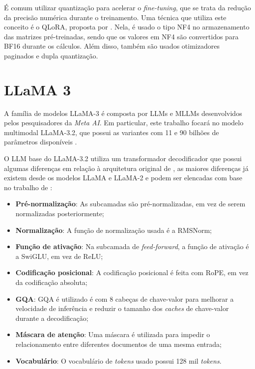 
É comum utilizar quantização para acelerar o \textit{fine-tuning}, que se trata da redução da precisão numérica durante o treinamento. Uma técnica que utiliza este
conceito é o \ac{QLoRA}, proposta por \textcite{qlora}. Nela, é usado o tipo \ac{NF4} no armazenamento das matrizes pré-treinadas, sendo que os valores em \ac{NF4} são
convertidos para \ac{BF16} durante os cálculos. Além disso, também são usados otimizadores paginados e dupla quantização.

\section{LLaMA 3}

A família de modelos \ac{LLaMA}-3 é composta por \acp{LLM} e \acp{MLLM} desenvolvidos pelos pesquisadores da
\textit{Meta AI}. Em particular, este trabalho focará no modelo multimodal \ac{LLaMA}-3.2, que possui as variantes com
11 e 90 bilhões de parâmetros disponíveis \cite{dubey2024llama}.

O \ac{LLM} base do \ac{LLaMA}-3.2 utiliza um transformador decodificador que possui algumas diferenças em relação à
arquitetura original de \textcite{transformer}, as maiores diferenças já existem desde os modelos \ac{LLaMA} e
\ac{LLaMA}-2 e podem ser elencadas com base no trabalho de \textcite{touvron2023llama}:

\begin{itemize}
    \item \textbf{Pré-normalização}: As subcamadas são pré-normalizadas, em vez de serem normalizadas posteriormente;
    \item \textbf{Normalização}: A função de normalização usada é a \ac{RMSNorm};
    \item \textbf{Função de ativação}: Na subcamada de \textit{feed-forward}, a função de ativação é a \ac{SwiGLU}, em vez de
          \ac{ReLU};
    \item \textbf{Codificação posicional}: A codificação posicional é feita com \ac{RoPE}, em vez da codificação absoluta;
    \item \textbf{\acs{GQA}}: \ac{GQA} é utilizado é com 8 cabeças de chave-valor para melhorar a velocidade de inferência e
          reduzir o tamanho dos \textit{caches} de chave-valor durante a decodificação;
    \item \textbf{Máscara de atenção}: Uma máscara é utilizada para impedir o relacionamento entre diferentes documentos de uma
          mesma entrada;
    \item \textbf{Vocabulário}: O vocabulário de \textit{tokens} usado possui 128 mil \textit{tokens}.
\end{itemize}

